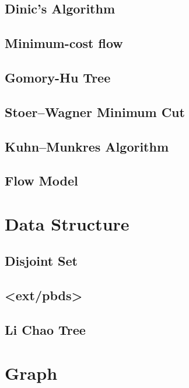 \documentclass[a4paper,10pt,twocolumn,oneside]{article}
\begin{document}
\subsection{Dinic's Algorithm}

% 
\subsection{Minimum-cost flow}

\subsection{Gomory-Hu Tree}

\subsection{Stoer–Wagner Minimum Cut}

\subsection{Kuhn–Munkres Algorithm}

\subsection{Flow Model}

\section{Data Structure}
\subsection{Disjoint Set}

\subsection{<ext/pbds>}

\subsection{Li Chao Tree}

\section{Graph}
\end{document}
